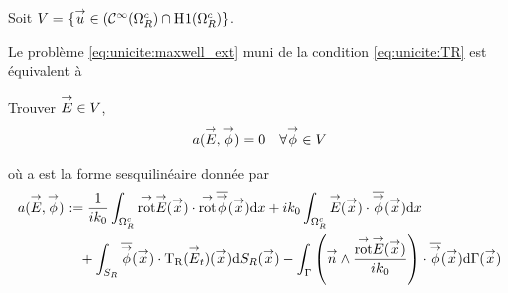   Soit \(V = \lbrace \vect{u} \in (\mathcal{C}^\infty(\OO^c_R)\cap\Sobolev[1](\OO^c_R) \rbrace\).

  Le problème \eqref{eq:unicite:maxwell_ext} muni de la condition \eqref{eq:unicite:TR} est équivalent à
  \begin{prop}
    Trouver \(\vE \in V\),
    \begin{align*}
      a(\vE,\vect\phi) = 0 && \forall \vect \phi \in V
    \end{align*}

    où a est la forme sesquilinéaire donnée par
    \begin{equation*}
      \begin{aligned}
      a(\vE,\vect\phi) &:=  \frac{1}{ik_0} \int_{\OO^c_R} \trot \vE(\vx) \cdot \trot \conj{\vect{\phi}}(\vx) \dd{x} + ik_0\int_{\OO^c_R}\vE(\vx)\cdot\conj{\vect{\phi}}(\vx) \dd{x}
        \\ 
        & \quad + \int_{S_R} \conj{ \vect \phi }(\vx) \cdot \Tr(\vE_t)(\vx) \dd{S_R}(\vx) - \int_\Gamma \left(\vn \pvect \frac{\trot \vE(\vx)}{ik_0}\right) \cdot \conj{\vect \phi} (\vx) \dd{\Gamma}(\vx)
      \end{aligned}
    \end{equation*}
  \end{prop}

